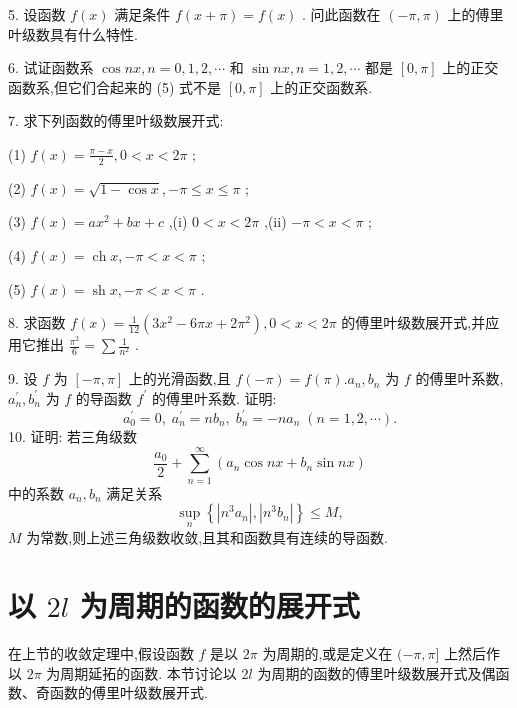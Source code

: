5. 设函数 \(f\left( x\right)\) 满足条件 \(f\left( {x + \pi }\right)  = f\left( x\right)\) . 问此函数在 \(\left( {-\pi ,\pi }\right)\) 上的傅里叶级数具有什么特性.

6. 试证函数系 \(\cos {nx},n = 0,1,2,\cdots\) 和 \(\sin {nx},n = 1,2,\cdots\) 都是 \(\left\lbrack  {0,\pi }\right\rbrack\) 上的正交函数系,但它们合起来的 (5) 式不是 \(\left\lbrack  {0,\pi }\right\rbrack\) 上的正交函数系.

7. 求下列函数的傅里叶级数展开式:

(1) \(f\left( x\right)  = \frac{\pi  - x}{2},0 < x < {2\pi }\) ;

(2) \(f\left( x\right)  = \sqrt{1 - \cos x}, - \pi  \leq  x \leq  \pi\) ;

(3) \(f\left( x\right)  = a{x}^{2} + {bx} + c\) ,(i) \(0 < x < {2\pi }\) ,(ii) \(- \pi  < x < \pi\) ;

(4) \(f\left( x\right)  = \operatorname{ch}x, - \pi  < x < \pi\) ;

(5) \(f\left( x\right)  = \operatorname{sh}x, - \pi  < x < \pi\) .

8. 求函数 \(f\left( x\right)  = \frac{1}{12}\left( {3{x}^{2} - {6\pi x} + 2{\pi }^{2}}\right) ,0 < x < {2\pi }\) 的傅里叶级数展开式,并应用它推出 \(\frac{{\pi }^{2}}{6} = \sum \frac{1}{{n}^{2}}\) .

9. 设 \(f\) 为 \(\left\lbrack  {-\pi ,\pi }\right\rbrack\) 上的光滑函数,且 \(f\left( {-\pi }\right)  = f\left( \pi \right) .{a}_{n},{b}_{n}\) 为 \(f\) 的傅里叶系数, \({a}_{n}^{\prime },{b}_{n}^{\prime }\) 为 \(f\) 的导函数 \({f}^{\prime }\) 的傅里叶系数. 证明:
\[
{a}_{0}^{\prime } = 0,\;{a}_{n}^{\prime } = n{b}_{n},\;{b}_{n}^{\prime } =  - n{a}_{n}\;\left( {n = 1,2,\cdots }\right) .
\]
10. 证明: 若三角级数
\[
\frac{{a}_{0}}{2} + \mathop{\sum }\limits_{{n = 1}}^{\infty }\left( {{a}_{n}\cos {nx} + {b}_{n}\sin {nx}}\right)
\]
中的系数 \({a}_{n},{b}_{n}\) 满足关系
\[
\mathop{\sup }\limits_{n}\left\{  {\left| {{n}^{3}{a}_{n}}\right| ,\left| {{n}^{3}{b}_{n}}\right| }\right\}   \leq  M,
\]
\(M\) 为常数,则上述三角级数收敛,且其和函数具有连续的导函数.

\section{以 \({2l}\) 为周期的函数的展开式}

在上节的收敛定理中,假设函数 \(f\) 是以 \({2\pi }\) 为周期的,或是定义在 \(( - \pi ,\pi \rbrack\) 上然后作以 \({2\pi }\) 为周期延拓的函数. 本节讨论以 \({2l}\) 为周期的函数的傅里叶级数展开式及偶函数、奇函数的傅里叶级数展开式.

